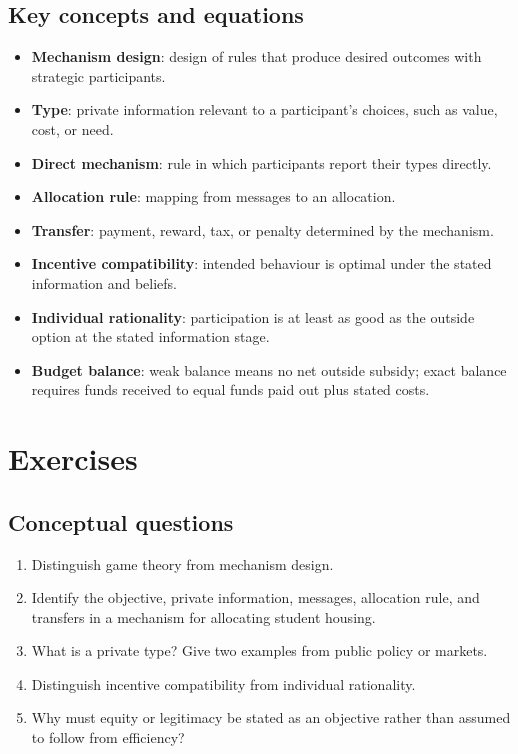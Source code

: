 \subsection*{Key concepts and equations}
\begin{itemize}
  \item \textbf{Mechanism design}: design of rules that produce desired outcomes with strategic participants.
  \item \textbf{Type}: private information relevant to a participant's choices, such as value, cost, or need.
  \item \textbf{Direct mechanism}: rule in which participants report their types directly.
  \item \textbf{Allocation rule}: mapping from messages to an allocation.
  \item \textbf{Transfer}: payment, reward, tax, or penalty determined by the mechanism.
  \item \textbf{Incentive compatibility}: intended behaviour is optimal under
  the stated information and beliefs.
  \item \textbf{Individual rationality}: participation is at least as good as
  the outside option at the stated information stage.
  \item \textbf{Budget balance}: weak balance means no net outside subsidy;
  exact balance requires funds received to equal funds paid out plus stated
  costs.
\end{itemize}

\section*{Exercises}

\subsection*{Conceptual questions}
\begin{enumerate}[label=\arabic*.]
  \item Distinguish game theory from mechanism design.
  \item Identify the objective, private information, messages, allocation rule, and transfers in a mechanism for allocating student housing.
  \item What is a private type? Give two examples from public policy or markets.
  \item Distinguish incentive compatibility from individual rationality.
  \item Why must equity or legitimacy be stated as an objective rather than assumed to follow from efficiency?
\end{enumerate}

